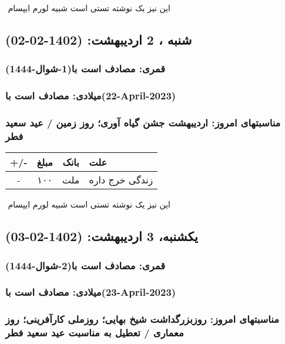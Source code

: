 \documentclass{article}
\newcommand{\rnote}[1]{\marginpar{\textcolor{color}{\StrSubstitute{\##1}{ }{\_}}}}
\newcommand{\myRow}[4]{
    #1 & #2 & #3 & #4 \\ \hline
}
\begin{document}
‌
\rnote{تست}
این نیز یک نوشته تستی است شبیه لورم ایپسام




\newpage
{}
\textcolor{color}{
\section{ شنبه ، 2 اردیبهشت: (1402-02-02) }
\subsubsection*{قمری: مصادف است با(1-شوال-1444)} 
\subsubsection*{میلادی: مصادف است با(22-April-2023)}
\subsubsection*{مناسبتهای امروز: اردیبهشت جشن گیاه آوری؛ روز زمین / عید سعید فطر}
}


\begin{tabular}{ | c | c | c | p{5cm} |}
    \hline
    \myRow{ +/- }{مبلغ}{بانک}{علت}
    \myRow{-}{۱۰۰}{ملت}{زندگی خرج داره}
\end{tabular}
\newline
\newline

‌
\rnote{تست}
این نیز یک نوشته تستی است شبیه لورم ایپسام




\newpage
{}
\textcolor{color}{
\section{ یکشنبه، 3 اردیبهشت: (1402-02-03) }
\subsubsection*{قمری: مصادف است با(2-شوال-1444)} 
\subsubsection*{میلادی: مصادف است با(23-April-2023)}
\subsubsection*{مناسبتهای امروز: روزبزرگداشت شیخ بهایی؛ روزملی کارآفرینی؛ روز معماری / تعطیل به مناسبت عید سعید فطر}
}
\end{document}
